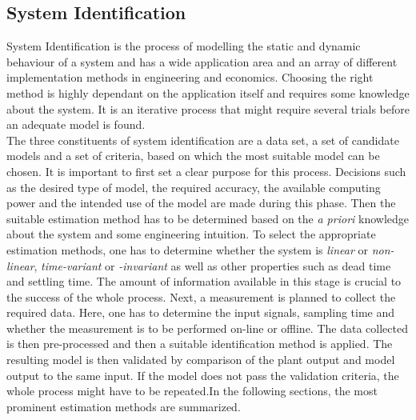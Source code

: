 \documentclass[9pt, twoside]{article}
\begin{document}
\begin{multicols}{2}
\subsection{System Identification}
\label{chap:SI}
System Identification is the process of modelling the static and dynamic behaviour of a system and has a wide application area and an array of different implementation methods in engineering and economics. Choosing the right method is highly dependant on the application itself and requires some knowledge about the system. It is an iterative process that might require several trials before an adequate model is found.\newline
\\
 The three constituents of system identification are a data set, a set of candidate models and a set of criteria, based on which the most suitable model can be chosen. It is important to first set a clear purpose for this process. Decisions such as the desired type of model, the required accuracy, the available computing power and the intended use of the model are made during this phase. Then the suitable estimation method has to be determined based on the \textit{a priori} knowledge about the system and some engineering intuition. To select the appropriate estimation methods, one has to determine whether the system is \textit{linear} or \textit{non-linear}, \textit{time-variant} or \textit{-invariant} as well as other properties such as dead time and settling time. The amount of information available in this stage is crucial to the success of the whole process. Next, a measurement is planned to collect the required data. Here, one has to determine the input signals, sampling time and whether the measurement is to be performed on-line or offline. The data collected is then pre-processed and then a suitable identification method is applied. The resulting model is then validated by comparison of the plant output and model output to the same input. If the model does not pass the validation criteria, the whole process might have to be repeated.In the following sections, the most prominent estimation methods are summarized.\cite{isermann2010identification}\\

\end{multicols}
\end{document}
